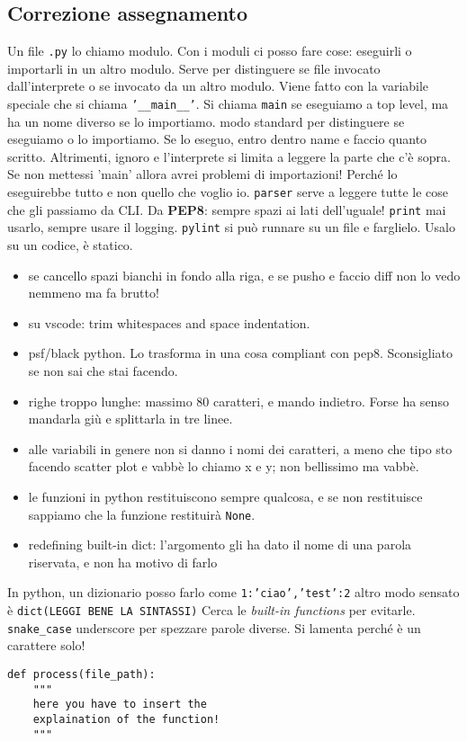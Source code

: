 \documentclass[10pt, a4paper, titlepage]{book}
\begin{document}
\subsection{Correzione assegnamento}

Un file \texttt{.py} lo chiamo modulo. Con i moduli ci posso fare cose: eseguirli o importarli in un altro modulo.
Serve per distinguere se file invocato dall'interprete o se invocato da un altro modulo. Viene fatto con la variabile speciale che si chiama \texttt{'__main__'}. 
Si chiama \texttt{main} se eseguiamo a top level, ma ha un nome diverso se lo importiamo.
modo standard per distinguere se eseguiamo o lo importiamo.
Se lo eseguo, entro dentro name e faccio quanto scritto. Altrimenti, ignoro e l'interprete si limita a leggere la parte che c'è sopra.
Se non mettessi 'main' allora avrei problemi di importazioni! Perché lo eseguirebbe tutto e non quello che voglio io.
\texttt{parser} serve a leggere tutte le cose che gli passiamo da  CLI. 
Da \textbf{PEP8}: sempre spazi ai lati dell'uguale!
\texttt{print} mai usarlo, sempre usare il logging.
\texttt{pylint} si può runnare su un file e farglielo. Usalo su un codice, è statico.
\begin{itemize}
	\item se cancello spazi bianchi in fondo alla riga, e se pusho e faccio diff non lo vedo nemmeno ma fa brutto!
	\item su vscode: trim whitespaces and space indentation.
	\item psf/black python. Lo trasforma in una cosa compliant con pep8. Sconsigliato se non sai che stai facendo.
	\item righe troppo lunghe: massimo 80 caratteri, e mando indietro. Forse ha senso mandarla giù e splittarla in tre linee.
	\item alle variabili in genere non si danno i nomi dei caratteri, a meno che tipo sto facendo scatter plot e vabbè lo chiamo x e y; non bellissimo ma vabbè.
	\item le funzioni in python restituiscono sempre qualcosa, e se non restituisce sappiamo che la funzione restituirà \texttt{None}.
	\item redefining built-in dict: l'argomento gli ha dato il nome di una parola riservata, e non ha motivo di farlo
 
\end{itemize}

In python, un dizionario posso farlo come \texttt{{1:'ciao','test':2}}
altro modo sensato è \texttt{dict(LEGGI BENE LA SINTASSI)}
Cerca le \textit{built-in functions} per evitarle.
\texttt{snake\_case} underscore per spezzare parole diverse. Si lamenta perché è un carattere solo!
\begin{verbatim}
def process(file_path):
	"""
	here you have to insert the 
	explaination of the function!
	"""
\end{verbatim}
\end{document}
